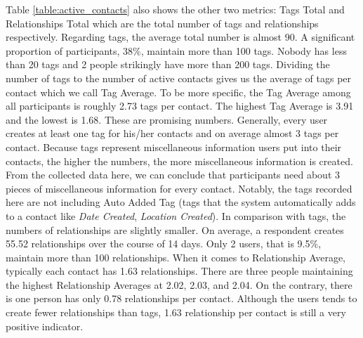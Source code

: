 Table \ref{table:active_contacts} also shows the other two metrics: Tags Total and Relationships Total which are the total number of tags and relationships respectively. Regarding tags, the average total number is almost 90. A significant proportion of participants, 38\%, maintain more than 100 tags. Nobody has less than 20 tags and 2 people strikingly have more than 200 tags. Dividing the number of tags to the number of active contacts gives us the average of tags per contact which we call Tag Average. To be more specific, the Tag Average among all participants is roughly 2.73 tags per contact. The highest Tag Average is 3.91 and the lowest is 1.68. These are promising numbers. Generally, every user creates at least one tag for his/her contacts and on average almost 3 tags per contact. Because tags represent miscellaneous information users put into their contacts, the higher the numbers, the more miscellaneous information is created. From the collected data here, we can conclude that participants need about 3 pieces of miscellaneous information for every contact. Notably, the tags recorded here are not including Auto Added Tag (tags that the system automatically adds to a contact like \textit{Date Created}, \textit{Location Created}). In comparison with tags, the numbers of relationships are slightly smaller. On average, a respondent creates 55.52 relationships over the course of 14 days. Only 2 users, that is 9.5\%, maintain more than 100 relationships. When it comes to Relationship Average, typically each contact has 1.63 relationships. There are three people maintaining the highest Relationship Averages at 2.02, 2.03, and 2.04. On the contrary, there is one person has only 0.78 relationships per contact. Although the users tends to create fewer relationships than tags, 1.63 relationship per contact is still a very positive indicator.

